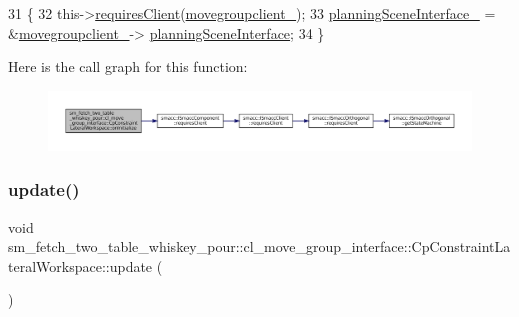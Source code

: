 \begin{DoxyCode}
31         \{
32             this->\hyperlink{classsmacc_1_1ISmaccComponent_a36c085d906fbae0fcaee817aaeafebf4}{requiresClient}(\hyperlink{classsm__fetch__two__table__whiskey__pour_1_1cl__move__group__interface_1_1CpConstraintLateralWorkspace_a0420ab20f9b4381751b273fc35f8ead9}{movegroupclient\_});
33             \hyperlink{classsm__fetch__two__table__whiskey__pour_1_1cl__move__group__interface_1_1CpConstraintLateralWorkspace_a02ced63947e6608c9949b491b2575e3e}{planningSceneInterface\_} = &\hyperlink{classsm__fetch__two__table__whiskey__pour_1_1cl__move__group__interface_1_1CpConstraintLateralWorkspace_a0420ab20f9b4381751b273fc35f8ead9}{movegroupclient\_}->
      \hyperlink{classcl__move__group__interface_1_1ClMoveGroup_a11bfab580f36e2ad32c9b37d6f58f44c}{planningSceneInterface};
34         \}
\end{DoxyCode}
Here is the call graph for this function\+:
\nopagebreak
\begin{figure}[H]
\begin{center}
\leavevmode
\includegraphics[width=350pt]{classsm__fetch__two__table__whiskey__pour_1_1cl__move__group__interface_1_1CpConstraintLateralWorkspace_a420fcf0fc6f89007a313e70458bca06c_cgraph}
\end{center}
\end{figure}
\mbox{\label{classsm__fetch__two__table__whiskey__pour_1_1cl__move__group__interface_1_1CpConstraintLateralWorkspace_afbbf07ecc60348ce0f40f6aa0c6fd6f3}} 
\subsubsection{\texorpdfstring{update()}{update()}}
{\footnotesize\ttfamily void sm\+\_\+fetch\+\_\+two\+\_\+table\+\_\+whiskey\+\_\+pour\+::cl\+\_\+move\+\_\+group\+\_\+interface\+::\+Cp\+Constraint\+Lateral\+Workspace\+::update (\begin{DoxyParamCaption}{ }\end{DoxyParamCaption})\hspace{0.3cm}{\ttfamily [virtual]}}



